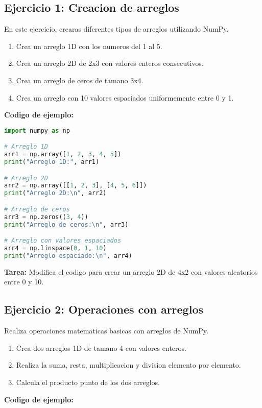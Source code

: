 \documentclass[a4paper,12pt]{article}
\begin{document}
\subsection{Ejercicio 1: Creacion de arreglos}
En este ejercicio, crearas diferentes tipos de arreglos utilizando NumPy.

\begin{enumerate}
    \item Crea un arreglo 1D con los numeros del 1 al 5.
    \item Crea un arreglo 2D de 2x3 con valores enteros consecutivos.
    \item Crea un arreglo de ceros de tamano 3x4.
    \item Crea un arreglo con 10 valores espaciados uniformemente entre 0 y 1.
\end{enumerate}

\textbf{Codigo de ejemplo:}

\begin{lstlisting}[language=Python]
import numpy as np

# Arreglo 1D
arr1 = np.array([1, 2, 3, 4, 5])
print("Arreglo 1D:", arr1)

# Arreglo 2D
arr2 = np.array([[1, 2, 3], [4, 5, 6]])
print("Arreglo 2D:\n", arr2)

# Arreglo de ceros
arr3 = np.zeros((3, 4))
print("Arreglo de ceros:\n", arr3)

# Arreglo con valores espaciados
arr4 = np.linspace(0, 1, 10)
print("Arreglo espaciado:\n", arr4)
\end{lstlisting}

\textbf{Tarea:} Modifica el codigo para crear un arreglo 2D de 4x2 con valores aleatorios entre 0 y 10.

\subsection{Ejercicio 2: Operaciones con arreglos}
Realiza operaciones matematicas basicas con arreglos de NumPy.

\begin{enumerate}
    \item Crea dos arreglos 1D de tamano 4 con valores enteros.
    \item Realiza la suma, resta, multiplicacion y division elemento por elemento.
    \item Calcula el producto punto de los dos arreglos.
\end{enumerate}

\textbf{Codigo de ejemplo:}
\end{document}
